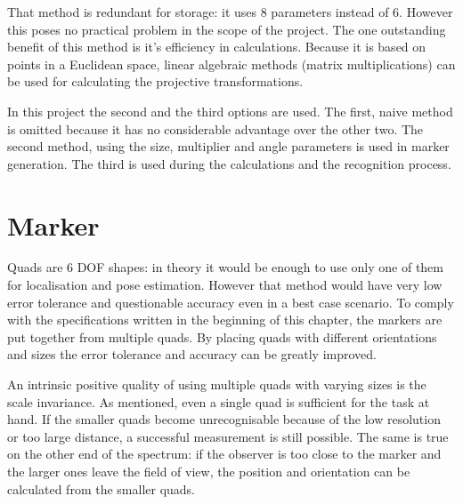 That method is redundant for storage: it uses 8 parameters instead of 6.
However this poses no practical problem in the scope of the project.
The one outstanding benefit of this method is it's efficiency in calculations.
Because it is based on points in a Euclidean space, linear algebraic methods (matrix multiplications) can be used for calculating the projective transformations.

In this project the second and the third options are used.
The first, naive method is omitted because it has no considerable advantage over the other two.
The second method, using the size, multiplier and angle parameters is used in marker generation.
The third is used during the calculations and the recognition process.

\section{Marker}

Quads are 6 DOF shapes: in theory it would be enough to use only one of them for localisation and pose estimation.
However that method would have very low error tolerance and questionable accuracy even in a best case scenario.
To comply with the specifications written in the beginning of this chapter, the markers are put together from multiple quads.
By placing quads with different orientations and sizes the error tolerance and accuracy can be greatly improved.

An intrinsic positive quality of using multiple quads with varying sizes is the scale invariance.
As mentioned, even a single quad is sufficient for the task at hand.
If the smaller quads become unrecognisable because of the low resolution or too large distance, a successful measurement is still possible.
The same is true on the other end of the spectrum: if the observer is too close to the marker and the larger ones leave the field of view, the position and orientation can be calculated from the smaller quads.

